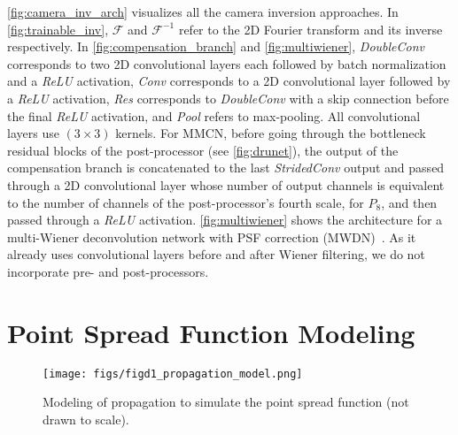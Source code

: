 \noindent \cref{fig:camera_inv_arch} visualizes all the camera inversion approaches.
In \cref{fig:trainable_inv}, $\mathcal{F}$ and $\mathcal{F}^{-1}$ refer to the 2D Fourier transform and its inverse respectively.
In \cref{fig:compensation_branch} and \cref{fig:multiwiener}, \textit{DoubleConv} corresponds to two 2D convolutional layers each followed by batch normalization and a \textit{ReLU} activation, \textit{Conv} corresponds to a 2D convolutional layer followed by a \textit{ReLU} activation, \textit{Res} corresponds to \textit{DoubleConv} with a skip connection before the final \textit{ReLU} activation, and \textit{Pool} refers to max-pooling. All convolutional layers use $(3\times3)$ kernels.
For MMCN, before going through the bottleneck residual blocks of the post-processor (see \cref{fig:drunet}), the output of the compensation branch is concatenated to the last \textit{StridedConv} output and passed through a 2D convolutional layer whose number of output channels is equivalent to the number of channels of the post-processor's fourth scale,  for $P_8$, and then passed through a \textit{ReLU} activation.
\cref{fig:multiwiener} shows the architecture for a multi-Wiener deconvolution network with PSF correction (MWDN)~\cite{Li:23}.
As it already uses convolutional layers before and after Wiener filtering, we do not incorporate pre- and post-processors.

\section{Point Spread Function Modeling}
\label{app:psf_modeling}

\begin{figure}[t!]
	\centering
	\texttt{[image: figs/figd1\_propagation\_model.png]}
	\caption{Modeling of propagation to simulate the point spread function (not drawn to scale).}
	\label{fig:propagation_model}
\end{figure}

